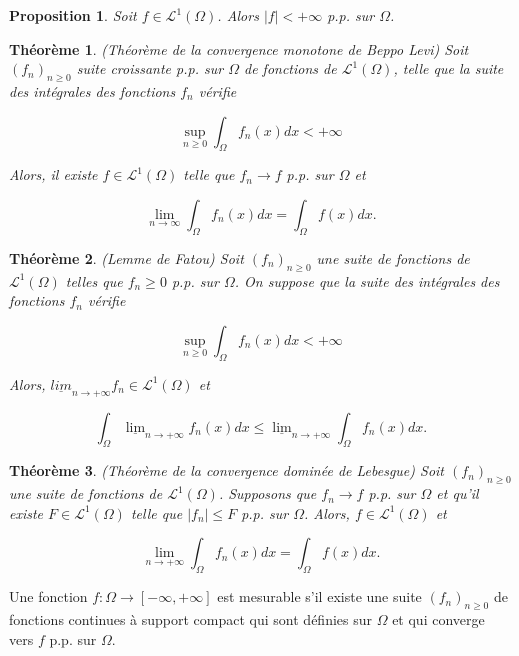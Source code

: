 \documentclass[10pt,a4paper,oneside]{article}
\newtheorem{theoreme}{Théorème}
\newtheorem{proposition}{Proposition}
\newenvironment{definition}[1][Definition]{\begin{trivlist}
\item[\hskip \labelsep {\bfseries #1}]}{\end{trivlist}}
\begin{document}
\begin{proposition}
Soit $f \in \mathcal{L}^1(\Omega)$. Alors $|f| < +\infty$ p.p. sur $\Omega$.
\end{proposition}

\begin{theoreme}
(Théorème de la convergence monotone de Beppo Levi)
Soit $(f_n)_{n \geq 0}$ suite croissante p.p. sur $\Omega$ de fonctions de $\mathcal{L}^1(\Omega)$, telle que la suite des intégrales des fonctions $f_n$ vérifie

\[ \sup_{n \geq 0} \int_\Omega f_n(x) dx < +\infty \]

Alors, il existe $f \in \mathcal{L}^1(\Omega)$ telle que $f_n \to f$ p.p. sur $\Omega$ et

\[ \lim_{n \to \infty} \int_\Omega f_n(x) dx = \int_\Omega f(x) dx. \]
\end{theoreme}

\begin{theoreme}
(Lemme de Fatou)
Soit $(f_n)_{n \geq 0}$ une suite de fonctions de $\mathcal{L}^1(\Omega)$ telles que $f_n \geq 0$ p.p. sur $\Omega$. On suppose que la suite des intégrales des fonctions $f_n$ vérifie

\[ \sup_{n \geq 0} \int_\Omega f_n(x) dx < +\infty \]

Alors, $\underline{lim}_{n \to +\infty} f_n \in \mathcal{L}^1(\Omega)$ et

\[ \int_\Omega \underline{\lim}_{n \to +\infty} f_n(x) dx \leq \underline{\lim}_{n \to +\infty} \int_\Omega f_n(x) dx. \]
\end{theoreme}

\begin{theoreme}
(Théorème de la convergence dominée de Lebesgue)
Soit $(f_n)_{n \geq 0}$ une suite de fonctions de $\mathcal{L}^1(\Omega)$. Supposons que $f_n \to f$ p.p. sur $\Omega$ et qu'il existe $F \in \mathcal{L}^1(\Omega)$ telle que $|f_n| \leq F$ p.p. sur $\Omega$. Alors, $f \in \mathcal{L}^1(\Omega)$ et

\[ \lim_{n \to +\infty} \int_\Omega f_n(x) dx = \int_\Omega f(x) dx. \]
\end{theoreme}

\begin{definition}
Une fonction $f : \Omega \to [-\infty,+\infty]$ est mesurable s'il existe une suite $(f_n)_{n \geq 0}$ de fonctions continues à support compact qui sont définies sur $\Omega$ et qui converge vers $f$ p.p. sur $\Omega$.
\end{definition}
\end{document}
